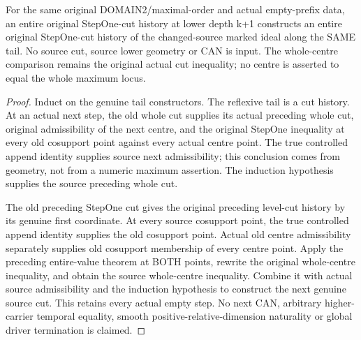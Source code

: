 \begin{theorem}
\label{hir:original-bound-two-stepone-empty-prefix-cut-tail}
\leanok
For the same original DOMAIN2/maximal-order and actual empty-prefix data,
an entire original StepOne-cut history at lower depth k+1 constructs an
entire original StepOne-cut history of the changed-source marked ideal
along the SAME tail. No source cut, source lower geometry or CAN is input.
The whole-centre comparison remains the original actual cut inequality;
no centre is asserted to equal the whole maximum locus.
\end{theorem}
\begin{proof}
Induct on the genuine tail constructors. The reflexive tail is a cut
history. At an actual next step, the old whole cut supplies its actual
preceding whole cut, original admissibility of the next centre, and the
original StepOne inequality at every old cosupport point against every
actual centre point. The true controlled append identity supplies source
next admissibility; this conclusion comes from geometry, not from a
numeric maximum assertion. The induction hypothesis supplies the source
preceding whole cut.

The old preceding StepOne cut gives the original preceding level-cut
history by its genuine first coordinate. At every source cosupport point,
the true controlled append identity supplies the old cosupport point.
Actual old centre admissibility separately supplies old cosupport
membership of every centre point. Apply the preceding entire-value theorem
at BOTH points, rewrite the original whole-centre inequality, and obtain
the source whole-centre inequality. Combine it with actual source
admissibility and the induction hypothesis to construct the next genuine
source cut. This retains every actual empty step. No next CAN, arbitrary
higher-carrier temporal equality, smooth positive-relative-dimension
naturality or global driver termination is claimed.
\end{proof}
